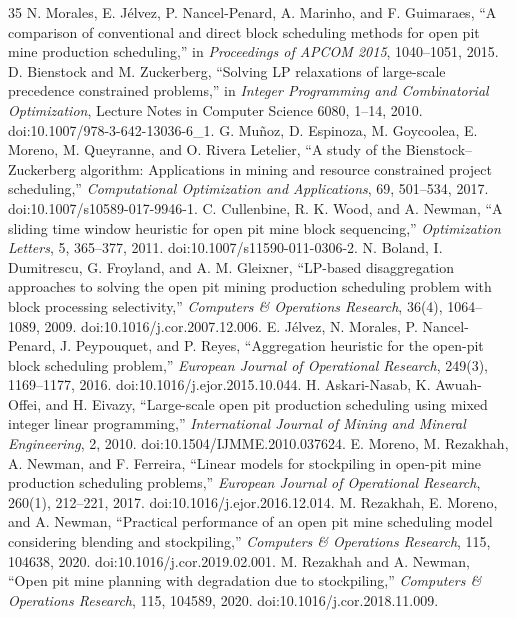 \documentclass[11pt]{article}
\begin{document}
\begin{thebibliography}{35}
 N. Morales, E. J\'elvez, P. Nancel-Penard, A. Marinho, and F. Guimaraes, ``A comparison of conventional and direct block scheduling methods for open pit mine production scheduling,'' in \emph{Proceedings of APCOM 2015}, 1040--1051, 2015.
 D. Bienstock and M. Zuckerberg, ``Solving LP relaxations of large-scale precedence constrained problems,'' in \emph{Integer Programming and Combinatorial Optimization}, Lecture Notes in Computer Science 6080, 1--14, 2010. doi:10.1007/978-3-642-13036-6\_1.
 G. Mu\~noz, D. Espinoza, M. Goycoolea, E. Moreno, M. Queyranne, and O. Rivera Letelier, ``A study of the Bienstock--Zuckerberg algorithm: Applications in mining and resource constrained project scheduling,'' \emph{Computational Optimization and Applications}, 69, 501--534, 2017. doi:10.1007/s10589-017-9946-1.
 C. Cullenbine, R. K. Wood, and A. Newman, ``A sliding time window heuristic for open pit mine block sequencing,'' \emph{Optimization Letters}, 5, 365--377, 2011. doi:10.1007/s11590-011-0306-2.
 N. Boland, I. Dumitrescu, G. Froyland, and A. M. Gleixner, ``LP-based disaggregation approaches to solving the open pit mining production scheduling problem with block processing selectivity,'' \emph{Computers \& Operations Research}, 36(4), 1064--1089, 2009. doi:10.1016/j.cor.2007.12.006.
 E. J\'elvez, N. Morales, P. Nancel-Penard, J. Peypouquet, and P. Reyes, ``Aggregation heuristic for the open-pit block scheduling problem,'' \emph{European Journal of Operational Research}, 249(3), 1169--1177, 2016. doi:10.1016/j.ejor.2015.10.044.
 H. Askari-Nasab, K. Awuah-Offei, and H. Eivazy, ``Large-scale open pit production scheduling using mixed integer linear programming,'' \emph{International Journal of Mining and Mineral Engineering}, 2, 2010. doi:10.1504/IJMME.2010.037624.
 E. Moreno, M. Rezakhah, A. Newman, and F. Ferreira, ``Linear models for stockpiling in open-pit mine production scheduling problems,'' \emph{European Journal of Operational Research}, 260(1), 212--221, 2017. doi:10.1016/j.ejor.2016.12.014.
 M. Rezakhah, E. Moreno, and A. Newman, ``Practical performance of an open pit mine scheduling model considering blending and stockpiling,'' \emph{Computers \& Operations Research}, 115, 104638, 2020. doi:10.1016/j.cor.2019.02.001.
 M. Rezakhah and A. Newman, ``Open pit mine planning with degradation due to stockpiling,'' \emph{Computers \& Operations Research}, 115, 104589, 2020. doi:10.1016/j.cor.2018.11.009.

\end{thebibliography}
\end{document}
